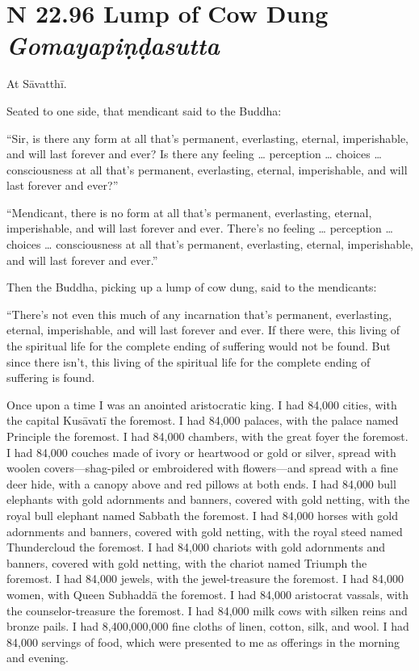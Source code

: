 \documentclass[12pt,openany]{book}%
\newcommand*{\suttatitleacronym}[1]{\smaller[2]{#1}\vspace*{.3em}}
\newcommand*{\suttatitletranslation}[1]{\linebreak{#1}}
\newcommand*{\suttatitleroot}[1]{\linebreak\smaller[2]\itshape{#1}}
\newcommand*{\tocacronym}[1]{\hspace*{-3.3em}{#1}\quad}
\newcommand*{\toctranslation}[1]{#1}
\newcommand*{\tocroot}[1]{(\textit{#1})}
\begin{document}
%
\section*{{\suttatitleacronym SN 22.96}{\suttatitletranslation A Lump of Cow Dung }{\suttatitleroot Gomayapiṇḍasutta}}
\addcontentsline{toc}{section}{\tocacronym{SN 22.96} \toctranslation{A Lump of Cow Dung } \tocroot{Gomayapiṇḍasutta}}

At \textsanskrit{Sāvatthī}. 

Seated to one side, that mendicant said to the Buddha: 

“Sir, is there any form at all that’s permanent, everlasting, eternal, imperishable, and will last forever and ever? Is there any feeling … perception … choices … consciousness at all that’s permanent, everlasting, eternal, imperishable, and will last forever and ever?” 

“Mendicant, there is no form at all that’s permanent, everlasting, eternal, imperishable, and will last forever and ever. There’s no feeling … perception … choices … consciousness at all that’s permanent, everlasting, eternal, imperishable, and will last forever and ever.” 

Then the Buddha, picking up a lump of cow dung, said to the mendicants: 

“There’s not even this much of any incarnation that’s permanent, everlasting, eternal, imperishable, and will last forever and ever. If there were, this living of the spiritual life for the complete ending of suffering would not be found. But since there isn’t, this living of the spiritual life for the complete ending of suffering is found. 

Once upon a time I was an anointed aristocratic king. I had 84,000 cities, with the capital \textsanskrit{Kusāvatī} the foremost. I had 84,000 palaces, with the palace named Principle the foremost. I had 84,000 chambers, with the great foyer the foremost. I had 84,000 couches made of ivory or heartwood or gold or silver, spread with woolen covers—shag-piled or embroidered with flowers—and spread with a fine deer hide, with a canopy above and red pillows at both ends. I had 84,000 bull elephants with gold adornments and banners, covered with gold netting, with the royal bull elephant named Sabbath the foremost. I had 84,000 horses with gold adornments and banners, covered with gold netting, with the royal steed named Thundercloud the foremost. I had 84,000 chariots with gold adornments and banners, covered with gold netting, with the chariot named Triumph the foremost. I had 84,000 jewels, with the jewel-treasure the foremost. I had 84,000 women, with Queen \textsanskrit{Subhaddā} the foremost. I had 84,000 aristocrat vassals, with the counselor-treasure the foremost. I had 84,000 milk cows with silken reins and bronze pails. I had 8,400,000,000 fine cloths of linen, cotton, silk, and wool. I had 84,000 servings of food, which were presented to me as offerings in the morning and evening. 
\end{document}
